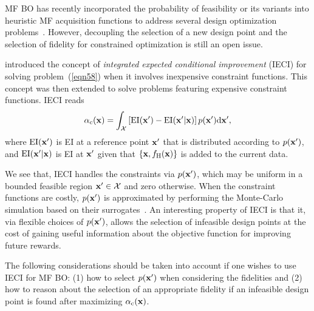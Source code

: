 \documentclass[journal ]{new-aiaa}
\begin{document}
MF BO has recently incorporated the probability of feasibility or its variants into heuristic MF acquisition functions to address several design optimization problems~\citep[see e.g.,][]{Ghoreishi2019,Ruan2020,Ribeiro2023}.
However, decoupling the selection of a new design point and the selection of fidelity for constrained optimization is still an open issue.

\citet{Gramacy2011} introduced the concept of \textit{integrated expected conditional improvement} (IECI) for solving problem~(\ref{eqn58}) when it involves inexpensive constraint functions.
This concept was then extended to solve problems featuring expensive constraint functions.
IECI reads
\begin{equation}\label{eqn61}
	\alpha_\text{c}({\bf x}) = \int_{\mathcal{X}} \left[\text{EI}({\bf x'}) - \text{EI}({\bf x'}|{\bf x})\right] p({\bf x'}) \text{d}{\bf x'},
\end{equation}
where $\text{EI}({\bf x'})$ is EI at a reference point $\bf x'$ that is distributed according to $p({\bf x'})$, and $\text{EI}({\bf x'}|{\bf x})$ is EI at $\bf x'$ given that $\{{\bf x},f_\text{H}({\bf x})\}$ is added to the current data.

We see that, IECI handles the constraints via $p({\bf x'})$, which may be uniform in a bounded feasible region ${\bf x'} \in \mathcal{X}$ and zero otherwise.
When the constraint functions are costly, $p({\bf x'})$ is approximated by performing the Monte-Carlo simulation based on their surrogates~\citep{Gramacy2011}.
An interesting property of IECI is that it, via flexible choices of $p({\bf x'})$, allows the selection of infeasible design points at the cost of gaining useful information about the objective function for improving future rewards.

The following considerations should be taken into account if one wishes to use IECI for MF BO: (1) how to select $p({\bf x'})$ when considering the fidelities and (2) how to reason about the selection of an appropriate fidelity if an infeasible design point is found after maximizing $\alpha_\text{c}({\bf x})$.  
\end{document}
